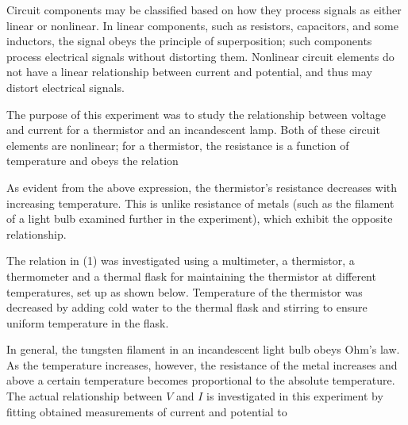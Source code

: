 \begin{paper}
	

	Circuit components may be classified based on how they process signals as either linear or nonlinear. In linear components, such as resistors, capacitors, and some inductors, the signal obeys the principle of superposition; such components process electrical signals without distorting them. Nonlinear circuit elements do not have a linear relationship between current and potential, and thus may distort electrical signals. 
	
	The purpose of this experiment was to study the relationship between voltage and current for a thermistor and an incandescent lamp. Both of these circuit elements are nonlinear; for a thermistor, the resistance is a function of temperature and obeys the relation
	
	\begin{paperwhere}
	\end{paperwhere}

	As evident from the above expression, the thermistor's resistance decreases with increasing temperature. This is unlike resistance of metals (such as the filament of a light bulb examined further in the experiment), which exhibit the opposite relationship.

	The relation in (1) was investigated using a multimeter, a thermistor, a thermometer and a thermal flask for maintaining the thermistor at different temperatures, set up as shown below. Temperature of the thermistor was decreased by adding cold water to the thermal flask and stirring to ensure uniform temperature in the flask. \vspace{-0.8em}
	
	
	In general, the tungsten filament in an incandescent light bulb obeys Ohm's law. As the temperature increases, however, the resistance of the metal increases and above a certain temperature becomes proportional to the absolute temperature. The actual relationship between \( V \) and \( I \) is investigated in this experiment by fitting obtained measurements of current and potential to 
	

\end{paper}
